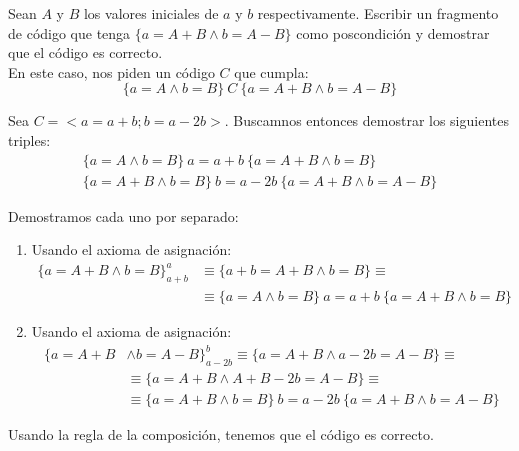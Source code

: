 \begin{ejercicio}
    Sean $A$ y $B$ los valores iniciales de $a$ y $b$ respectivamente. Escribir un fragmento de código que tenga $\{a=A+B \land b =A-B\}$ como poscondición y demostrar que el código es correcto.\\

    En este caso, nos piden un código $C$ que cumpla:
    \begin{equation*}
        \{a=A \land b=B\}\ C\ \{a=A+B \land b =A-B\}
    \end{equation*}

    Sea $C=<a=a+b; b=a-2b>$. Buscamnos entonces demostrar los siguientes triples:
    \begin{gather*}
        \{a=A \land b=B\}\ a=a+b\ \{a=A+B \land b=B\} \\
        \{a=A+B \land b=B\}\ b=a-2b\ \{a=A+B \land b=A-B\}
    \end{gather*}

    Demostramos cada uno por separado:
    \begin{enumerate}
        \item Usando el axioma de asignación:
            \begin{align*}
                \{a=A+B \land b=B\}_{a+b}^a
                &\equiv \{a+b=A+B \land b=B\}
                \equiv\\&\equiv \{a=A\land b=B\}\ a=a+b\ \{a=A+B \land b=B\}
            \end{align*}
        \item Usando el axioma de asignación:
            \begin{align*}
                \{a=A+B &\land b=A-B\}_{a-2b}^b
                \equiv \{a=A+B \land a-2b=A-B\}
                \equiv\\& \equiv \{a=A+B \land A+B-2b=A-B\}
                \equiv\\& \equiv \{a=A+B \land b=B\}\ b=a-2b\ \{a=A+B \land b=A-B\}
            \end{align*}
    \end{enumerate}
    Usando la regla de la composición, tenemos que el código es correcto.

\end{ejercicio}

